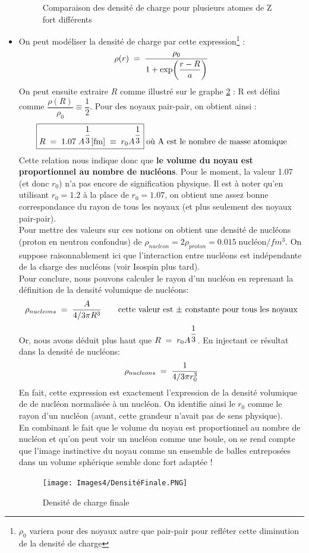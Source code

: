 \begin{itemize}
\begin{figure}[H]
        \caption{Comparaison des densité de charge pour plusieurs atomes de Z fort différents}
        \label{fig : Comparaison des densités de charge noyaux lourds}
    \end{figure}
    \item On peut modéliser la densité de charge par cette expression\footnote{$\rho_0$ variera pour des noyaux autre que pair-pair pour refléter cette diminution de la densité de charge} :
    \[
        \rho(r) \eq \dfrac{\rho_0}{1 + \exp(\dfrac{r - R}{a})}
    \]
    On peut ensuite extraire $R$ comme illustré sur le graphe \ref{fig : Densité de charge} : R est défini comme $\dfrac{\rho(R)}{\rho_0} \equiv \dfrac{1}{2}$. Pour des noyaux pair-pair, on obtient ainsi :
    \[
        \boxed{
            R \eq 1.07\; A^{\dfrac{1}{3}} [\si{fm}] \;\equiv\; r_0A^{\dfrac{1}{3}}
        } \; \text{où A est le nombre de masse atomique}
    \]
    Cette relation nous indique donc que \textbf{le volume du noyau est proportionnel au nombre de nucléons}. Pour le moment, la valeur 1.07 (et donc $r_0$) n'a pas encore de signification physique. Il est à noter qu'en utilisant $r_0=1.2$ à la place de $r_0=1.07$, on obtient une assez bonne correspondance du rayon de tous les noyaux (et plus seulement des noyaux pair-pair).
    \smallskip\\
    Pour mettre des valeurs sur ces notions on obtient une densité de nucléons (proton en neutron confondus) de $\rho_{nucleon} = 2\rho_{proton} = 0.015 \;\text{nucléon}/\si{fm^3}$. On suppose raisonnablement ici que l'interaction entre nucléons est indépendante de la charge des nucléons (voir Isospin plus tard).\\
    Pour conclure, nous pouvons calculer le rayon d'un nucléon
    en reprenant la définition de la densité volumique de nucléons:
    \[
        \rho_{nucleons} \eq \dfrac{A}{4/3 \pi R^3 } \qquad \text{cette valeur est $\pm$ constante pour tous les noyaux}
    \]
    Or, nous avons déduit plus haut que $R \eq r_0A^{\dfrac{1}{3}}$. En injectant ce résultat dans la densité de nucléons:
    \[
        \rho_{nucleons} \eq \dfrac{1}{4/3 \pi r_0^3}
    \]
    En fait, cette expression est exactement l'expression de la densité volumique de de nucléon normalisée à un nucléon. On identifie ainsi le $r_0$ comme le rayon d'un nucléon (avant, cette grandeur n'avait pas de sens physique).\\

    En combinant le fait que le volume du noyau est proportionnel au nombre de nucléon et qu'on peut voir un nucléon comme une boule, on se rend compte que l'image instinctive du noyau comme un ensemble de balles entreposées dans un volume sphérique semble donc fort adaptée !
    \begin{figure}[H]
        \centering
        \texttt{[image: Images4/DensitéFinale.PNG]}
        \caption{Densité de charge finale}
        \label{fig : Densité de charge}
    \end{figure}
\end{itemize}


